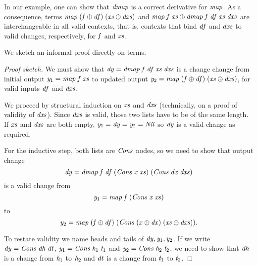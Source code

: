 In our example, one can show that \ensuremath{\Varid{dmap}} is a correct derivative
for \ensuremath{\Varid{map}}. As a consequence, terms \ensuremath{\Varid{map}\;(\Varid{f}\oplus \Varid{df})\;(\Varid{xs}\oplus \Varid{dxs})} and \ensuremath{\Varid{map}\;\Varid{f}\;\Varid{xs}\oplus \Varid{dmap}\;\Varid{f}\;\Varid{df}\;\Varid{xs}\;\Varid{dxs}} are
interchangeable in all valid contexts, that is, contexts that
bind \ensuremath{\Varid{df}} and \ensuremath{\Varid{dxs}} to valid changes, respectively, for \ensuremath{\Varid{f}} and
\ensuremath{\Varid{xs}}.

We sketch an informal proof directly on terms.
\begin{proof}[Proof sketch]
We must show that \ensuremath{\Varid{dy}\mathrel{=}\Varid{dmap}\;\Varid{f}\;\Varid{df}\;\Varid{xs}\;\Varid{dxs}} is a change change from
initial output \ensuremath{\Varid{y}_{1}\mathrel{=}\Varid{map}\;\Varid{f}\;\Varid{xs}} to updated output \ensuremath{\Varid{y}_{2}\mathrel{=}\Varid{map}\;(\Varid{f}\oplus \Varid{df})\;(\Varid{xs}\oplus \Varid{dxs})}, for valid inputs \ensuremath{\Varid{df}} and \ensuremath{\Varid{dxs}}.

We proceed by structural induction on \ensuremath{\Varid{xs}} and \ensuremath{\Varid{dxs}} (technically, on a
proof of validity of \ensuremath{\Varid{dxs}}). Since \ensuremath{\Varid{dxs}} is valid, those two
lists have to be of the same length. If \ensuremath{\Varid{xs}} and \ensuremath{\Varid{dxs}} are both
empty, \ensuremath{\Varid{y}_{1}\mathrel{=}\Varid{dy}\mathrel{=}\Varid{y}_{2}\mathrel{=}\Conid{Nil}} so \ensuremath{\Varid{dy}} is a valid change as required.

For the inductive step, both lists are \ensuremath{\Conid{Cons}} nodes, so we need
to show that output change
\[\mathit{dy}\mathrel{=}\mathit{dmap}\;\mathit{f}\;\mathit{df}\;(\mathit{Cons}\;\mathit{x}\;\mathit{xs})\;(\mathit{Cons}\;\mathit{dx}\;\mathit{dxs})\]
is a valid change from
\[\mathit{y}_{1}\mathrel{=}\mathit{map}\;\mathit{f}\;(\mathit{Cons}\;\mathit{x}\;\mathit{xs})\] to
\[\mathit{y}_{2}\mathrel{=}\mathit{map}\;(\mathit{f}\oplus \mathit{df})\;(\mathit{Cons}\;(\mathit{x}\oplus \mathit{dx})\;(\mathit{xs}\oplus \mathit{dxs})).\]

To restate validity we name heads and tails of \ensuremath{\Varid{dy},\Varid{y}_{1},\Varid{y}_{2}}.
If we write \ensuremath{\Varid{dy}\mathrel{=}\Conid{Cons}\;\Varid{dh}\;\Varid{dt}}, \ensuremath{\Varid{y}_{1}\mathrel{=}\Conid{Cons}\;\Varid{h}_{1}\;\Varid{t}_{1}} and \ensuremath{\Varid{y}_{2}\mathrel{=}\Conid{Cons}\;\Varid{h}_{2}\;\Varid{t}_{2}}, we need to show that \ensuremath{\Varid{dh}} is a change from \ensuremath{\Varid{h}_{1}} to \ensuremath{\Varid{h}_{2}}
and \ensuremath{\Varid{dt}} is a change from \ensuremath{\Varid{t}_{1}} to \ensuremath{\Varid{t}_{2}}.


\end{proof}
